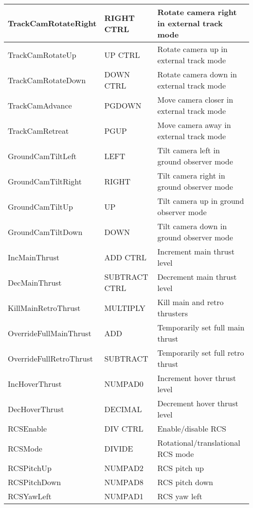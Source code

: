 \documentclass[Orbiter User Manual.tex]{subfiles}
\begin{document}
\begin{longtable}{ |p{}|p{}|p{}| }
	\hline\rule{0pt}{2ex}
	TrackCamRotateRight & RIGHT CTRL & Rotate camera right in external track mode\\
	\hline\rule{0pt}{2ex}
	TrackCamRotateUp & UP CTRL & Rotate camera up in external track mode\\
	\hline\rule{0pt}{2ex}
	TrackCamRotateDown & DOWN CTRL & Rotate camera down in external track mode\\
	\hline\rule{0pt}{2ex}
	TrackCamAdvance & PGDOWN & Move camera closer in external track mode\\
	\hline\rule{0pt}{2ex}
	TrackCamRetreat & PGUP & Move camera away in external track mode\\
	\hline\rule{0pt}{2ex}
	GroundCamTiltLeft & LEFT & Tilt camera left in ground observer mode\\
	\hline\rule{0pt}{2ex}
	GroundCamTiltRight & RIGHT & Tilt camera right in ground observer mode\\
	\hline\rule{0pt}{2ex}
	GroundCamTiltUp & UP & Tilt camera up in ground observer mode\\
	\hline\rule{0pt}{2ex}
	GroundCamTiltDown & DOWN & Tilt camera down in ground observer mode\\
	\hline\rule{0pt}{2ex}
	IncMainThrust & ADD CTRL & Increment main thrust level\\
	\hline\rule{0pt}{2ex}
	DecMainThrust & SUBTRACT CTRL & Decrement main thrust level\\
	\hline\rule{0pt}{2ex}
	KillMainRetroThrust & MULTIPLY & Kill main and retro thrusters\\
	\hline\rule{0pt}{2ex}
	OverrideFullMainThrust & ADD & Temporarily set full main thrust\\
	\hline\rule{0pt}{2ex}
	OverrideFullRetroThrust & SUBTRACT & Temporarily set full retro thrust\\
	\hline\rule{0pt}{2ex}
	IncHoverThrust & NUMPAD0 & Increment hover thrust level\\
	\hline\rule{0pt}{2ex}
	DecHoverThrust & DECIMAL & Decrement hover thrust level\\
	\hline\rule{0pt}{2ex}
	RCSEnable & DIV CTRL & Enable/disable RCS\\
	\hline\rule{0pt}{2ex}
	RCSMode & DIVIDE & Rotational/translational RCS mode\\
	\hline\rule{0pt}{2ex}
	RCSPitchUp & NUMPAD2 & RCS pitch up\\
	\hline\rule{0pt}{2ex}
	RCSPitchDown & NUMPAD8 & RCS pitch down\\
	\hline\rule{0pt}{2ex}
	RCSYawLeft & NUMPAD1 & RCS yaw left\\

\end{longtable}
\end{document}
